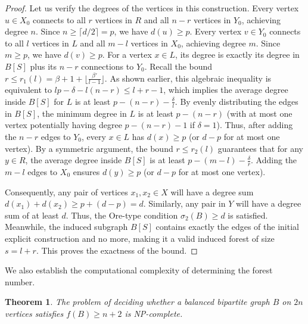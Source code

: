 \documentclass[a4paper]{amsart}
\newtheorem{theorem}{Theorem}[section]
\begin{document}
\begin{proof}
Let us verify the degrees of the vertices in this construction. 
Every vertex $u \in X_0$ connects to all $r$ vertices in $R$ and all $n-r$ vertices in $Y_0$, achieving degree $n$. Since $n \ge \lceil d/2 \rceil = p$, we have $d(u) \ge p$.
Every vertex $v \in Y_0$ connects to all $l$ vertices in $L$ and all $m-l$ vertices in $X_0$, achieving degree $m$. Since $m \ge p$, we have $d(v) \ge p$.
For a vertex $x \in L$, its degree is exactly its degree in $B[S]$ plus its $n-r$ connections to $Y_0$. 
Recall the bound $r \le r_1(l) = \beta + 1 + \lfloor \frac{\beta'}{l-1} \rfloor$. As shown earlier, this algebraic inequality is equivalent to $lp - \delta - l(n-r) \le l+r-1$, which implies the average degree inside $B[S]$ for $L$ is at least $p - (n-r) - \frac{\delta}{l}$. By evenly distributing the edges in $B[S]$, the minimum degree in $L$ is at least $p - (n-r)$ (with at most one vertex potentially having degree $p - (n-r) - 1$ if $\delta=1$). Thus, after adding the $n-r$ edges to $Y_0$, every $x \in L$ has $d(x) \ge p$ (or $d-p$ for at most one vertex). 
By a symmetric argument, the bound $r \le r_2(l)$ guarantees that for any $y \in R$, the average degree inside $B[S]$ is at least $p - (m-l) - \frac{\delta}{r}$. Adding the $m-l$ edges to $X_0$ ensures $d(y) \ge p$ (or $d-p$ for at most one vertex).

Consequently, any pair of vertices $x_1, x_2 \in X$ will have a degree sum $d(x_1) + d(x_2) \ge p + (d-p) = d$. Similarly, any pair in $Y$ will have a degree sum of at least $d$. 
Thus, the Ore-type condition $\sigma_2(B) \ge d$ is satisfied. 
Meanwhile, the induced subgraph $B[S]$ contains exactly the edges of the initial explicit construction and no more, making it a valid induced forest of size $s = l+r$.
This proves the exactness of the bound.
\end{proof}

We also establish the computational complexity of determining the forest number.

\begin{theorem}
    The problem of deciding whether a balanced bipartite graph $B$ on $2n$ vertices satisfies $f(B) \ge n+2$ is NP-complete.
\end{theorem}
\end{document}
